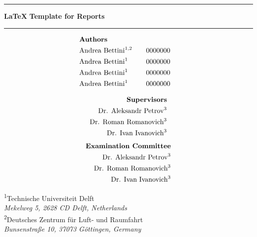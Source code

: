 \newcommand{\HRule}{\rule{\linewidth}{0.5mm}}
\thispagestyle{empty}
\HRule
\begin{center}
    \vspace{5mm}
    {\selectfont\huge\textbf{\LaTeX\,\,Template for Reports}} \\
    \vspace{5mm}
\end{center}
\vspace*{-0.8em}
\HRule


\vspace*{-1em}
\begin{minipage}[t]{0.4\textwidth}
    \begin{alignat*}{3}
        &\text{\textbf{Authors}} \\
        &\text{Andrea Bettini}\textsuperscript{1,2}     &\quad& 0000000 \\
        &\text{Andrea Bettini}\textsuperscript{1}       &\quad& 0000000 \\
        &\text{Andrea Bettini}\textsuperscript{1}       &\quad& 0000000 \\
        &\text{Andrea Bettini}\textsuperscript{1}       &\quad& 0000000
    \end{alignat*}
\end{minipage}
\hfill
\begin{minipage}[t]{0.4\textwidth}
    \begin{alignat*}{1}
    \text{\textbf{Supervisors}}& \\
        \text{Dr. Aleksandr Petrov}\textsuperscript{3}&     \\
        \text{Dr. Roman Romanovich}\textsuperscript{3}&      \\
        \text{Dr. Ivan Ivanovich}\textsuperscript{3}&
    \end{alignat*}
    \begin{alignat*}{1}
    \text{\textbf{Examination Committee}}& \\
        \text{Dr. Aleksandr Petrov}\textsuperscript{3}&     \\
        \text{Dr. Roman Romanovich}\textsuperscript{3}&      \\
        \text{Dr. Ivan Ivanovich}\textsuperscript{3}&
    \end{alignat*}
\end{minipage}

\begin{center}
    \normalsize{\textsuperscript{1}Technische Universiteit Delft} \\\footnotesize{\textit{Mekelweg 5, 2628 CD Delft, Netherlands}} \\\vspace{3mm}
    \normalsize{\textsuperscript{2}Deutsches Zentrum für Luft- und Raumfahrt} \\\footnotesize{\textit{Bunsenstraße 10, 37073 Göttingen, Germany}}
    \\
\end{center}

